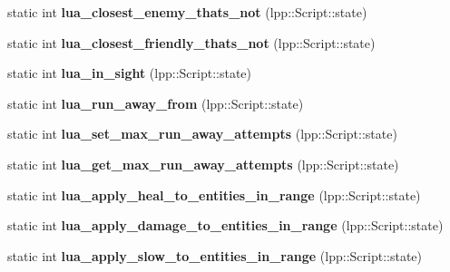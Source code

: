 \begin{DoxyCompactItemize}
\item 
static int {\bfseries lua\+\_\+closest\+\_\+enemy\+\_\+thats\+\_\+not} (lpp\+::\+Script\+::state)\hypertarget{class_lua_interface_a4140d12283dded7b4a4d6c16a0539681}{}\label{class_lua_interface_a4140d12283dded7b4a4d6c16a0539681}

\item 
static int {\bfseries lua\+\_\+closest\+\_\+friendly\+\_\+thats\+\_\+not} (lpp\+::\+Script\+::state)\hypertarget{class_lua_interface_a11c1bd3f3526cb0369ad798624124cdc}{}\label{class_lua_interface_a11c1bd3f3526cb0369ad798624124cdc}

\item 
static int {\bfseries lua\+\_\+in\+\_\+sight} (lpp\+::\+Script\+::state)\hypertarget{class_lua_interface_a7a318be9c3175f38343aed4e96ab1ddd}{}\label{class_lua_interface_a7a318be9c3175f38343aed4e96ab1ddd}

\item 
static int {\bfseries lua\+\_\+run\+\_\+away\+\_\+from} (lpp\+::\+Script\+::state)\hypertarget{class_lua_interface_acfa9c02f909e3a0a1e359729e4d9d9a2}{}\label{class_lua_interface_acfa9c02f909e3a0a1e359729e4d9d9a2}

\item 
static int {\bfseries lua\+\_\+set\+\_\+max\+\_\+run\+\_\+away\+\_\+attempts} (lpp\+::\+Script\+::state)\hypertarget{class_lua_interface_aee1979efa69cbf0529ce22b8299c4611}{}\label{class_lua_interface_aee1979efa69cbf0529ce22b8299c4611}

\item 
static int {\bfseries lua\+\_\+get\+\_\+max\+\_\+run\+\_\+away\+\_\+attempts} (lpp\+::\+Script\+::state)\hypertarget{class_lua_interface_a35b0eeeda887d10ccf2269fa065a08d7}{}\label{class_lua_interface_a35b0eeeda887d10ccf2269fa065a08d7}

\item 
static int {\bfseries lua\+\_\+apply\+\_\+heal\+\_\+to\+\_\+entities\+\_\+in\+\_\+range} (lpp\+::\+Script\+::state)\hypertarget{class_lua_interface_aedd2da5368ad870f203bd935e429c716}{}\label{class_lua_interface_aedd2da5368ad870f203bd935e429c716}

\item 
static int {\bfseries lua\+\_\+apply\+\_\+damage\+\_\+to\+\_\+entities\+\_\+in\+\_\+range} (lpp\+::\+Script\+::state)\hypertarget{class_lua_interface_a97ec4f46ec4d53b618e98be49531ed47}{}\label{class_lua_interface_a97ec4f46ec4d53b618e98be49531ed47}

\item 
static int {\bfseries lua\+\_\+apply\+\_\+slow\+\_\+to\+\_\+entities\+\_\+in\+\_\+range} (lpp\+::\+Script\+::state)\hypertarget{class_lua_interface_a94d0e9595530d7211c41bf9b2a1ff038}{}\label{class_lua_interface_a94d0e9595530d7211c41bf9b2a1ff038}


\end{DoxyCompactItemize}
